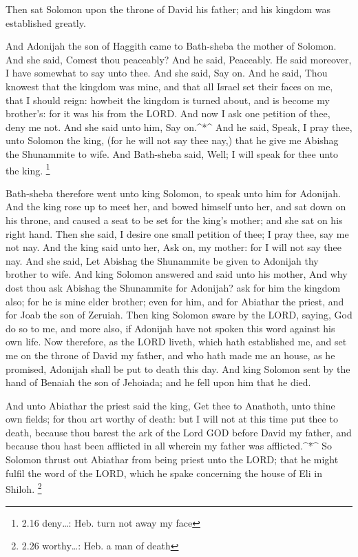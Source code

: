  Then sat Solomon upon the throne of David his father; and
his kingdom was established greatly.

 And Adonijah the son of Haggith came to Bath-sheba the
mother of Solomon. And she said, Comest thou peaceably? And he said,
Peaceably.  He said moreover, I have somewhat to say unto
thee. And she said, Say on.  And he said, Thou knowest that
the kingdom was mine, and that all Israel set their faces on me, that I
should reign: howbeit the kingdom is turned about, and is become my
brother's: for it was his from the LORD.  And now I ask one
petition of thee, deny me not. And she said unto him, Say on.\^{}*\^{}
 And he said, Speak, I pray thee, unto Solomon the king,
(for he will not say thee nay,) that he give me Abishag the Shunammite
to wife.  And Bath-sheba said, Well; I will speak for thee
unto the king. \footnote{2.16 deny\ldots: Heb. turn not away my face}

 Bath-sheba therefore went unto king Solomon, to speak unto
him for Adonijah. And the king rose up to meet her, and bowed himself
unto her, and sat down on his throne, and caused a seat to be set for
the king's mother; and she sat on his right hand.  Then she
said, I desire one small petition of thee; I pray thee, say me not nay.
And the king said unto her, Ask on, my mother: for I will not say thee
nay.  And she said, Let Abishag the Shunammite be given to
Adonijah thy brother to wife.  And king Solomon answered
and said unto his mother, And why dost thou ask Abishag the Shunammite
for Adonijah? ask for him the kingdom also; for he is mine elder
brother; even for him, and for Abiathar the priest, and for Joab the son
of Zeruiah.  Then king Solomon sware by the LORD, saying,
God do so to me, and more also, if Adonijah have not spoken this word
against his own life.  Now therefore, as the LORD liveth,
which hath established me, and set me on the throne of David my father,
and who hath made me an house, as he promised, Adonijah shall be put to
death this day.  And king Solomon sent by the hand of
Benaiah the son of Jehoiada; and he fell upon him that he died.

 And unto Abiathar the priest said the king, Get thee to
Anathoth, unto thine own fields; for thou art worthy of death: but I
will not at this time put thee to death, because thou barest the ark of
the Lord GOD before David my father, and because thou hast been
afflicted in all wherein my father was afflicted.\^{}*\^{} 
So Solomon thrust out Abiathar from being priest unto the LORD; that he
might fulfil the word of the LORD, which he spake concerning the house
of Eli in Shiloh. \footnote{2.26 worthy\ldots: Heb. a man of death}

